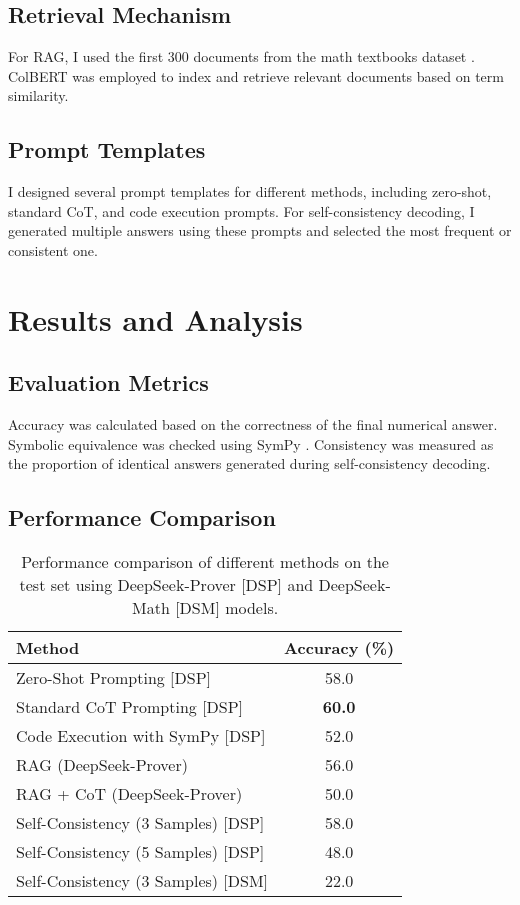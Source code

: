 \documentclass[11pt,a4paper]{article}
\begin{document}
\subsection{Retrieval Mechanism}
For RAG, I used the first 300 documents from the math textbooks dataset \cite{wentingzhao2023mathtextbooks}. ColBERT \cite{khattab2020colbert} was employed to index and retrieve relevant documents based on term similarity.

\subsection{Prompt Templates}
I designed several prompt templates for different methods, including zero-shot, standard CoT, and code execution prompts. For self-consistency decoding, I generated multiple answers using these prompts and selected the most frequent or consistent one.

\section{Results and Analysis}
\subsection{Evaluation Metrics}
Accuracy was calculated based on the correctness of the final numerical answer. Symbolic equivalence was checked using SymPy \cite{meurer2017sympy}. Consistency was measured as the proportion of identical answers generated during self-consistency decoding.

\subsection{Performance Comparison}
\begin{table}[H]
\centering
\footnotesize
\begin{tabular}{lc}
\toprule
\textbf{Method} & \textbf{Accuracy (\%)} \\
\midrule
Zero-Shot Prompting [DSP] & 58.0 \\
Standard CoT Prompting [DSP] & \textbf{60.0} \\
Code Execution with SymPy [DSP] & 52.0 \\
RAG (DeepSeek-Prover) & 56.0 \\
RAG + CoT (DeepSeek-Prover) & 50.0 \\
Self-Consistency (3 Samples) [DSP] & 58.0 \\
Self-Consistency (5 Samples) [DSP] & 48.0 \\
Self-Consistency (3 Samples) [DSM] & 22.0 \\
\bottomrule
\end{tabular}
\caption{Performance comparison of different methods on the test set using DeepSeek-Prover [DSP] and DeepSeek-Math [DSM] models.}
\label{tab:performance}
\end{table}
\end{document}

